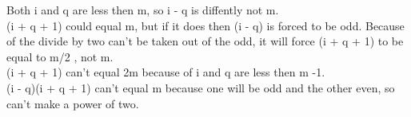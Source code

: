 \documentclass{article}
\begin{document}
\begin{description}
\begin{enumerate}
      Both i and q are less then m, so i - q is diffently not m. \\

      (i + q + 1) could equal m, but if it does then (i - q) is forced to be odd. Because of the divide by two can't be taken out of the odd, it will force (i + q + 1) to be equal to m/2 , not m. \\

      (i + q + 1) can't equal 2m because of i and q are less then m -1. \\

      (i - q)(i + q + 1) can't equal m because one will be odd and the other even, so can't make a power of two.


  \end{enumerate}
  

\end{description}
\end{document}
